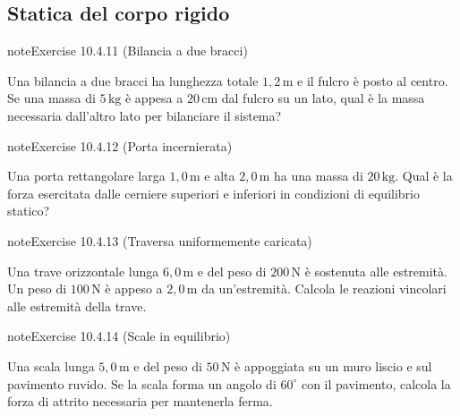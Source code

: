 \documentclass[letterpaper,10pt,italian]{jupyterBook}
\begin{document}
\subsection{Statica del corpo rigido}
\label{\detokenize{ch/mechanics/statics-problems:statica-del-corpo-rigido}} \label{exercise:ch/mechanics/statics-problems-exercise-10}

\begin{sphinxadmonition}{note}{Exercise 10.4.11 (Bilancia a due bracci)}



\sphinxAtStartPar
Una bilancia a due bracci ha lunghezza totale \(1,2 \, \text{m}\) e il fulcro è posto al centro. Se una massa di \(5 \, \text{kg}\) è appesa a \(20 \, \text{cm}\) dal fulcro su un lato, qual è la massa necessaria dall’altro lato per bilanciare il sistema?
\end{sphinxadmonition}
 \label{exercise:ch/mechanics/statics-problems-exercise-11}

\begin{sphinxadmonition}{note}{Exercise 10.4.12 (Porta incernierata)}



\sphinxAtStartPar
Una porta rettangolare larga \(1,0 \, \text{m}\) e alta \(2,0 \, \text{m}\) ha una massa di \(20 \, \text{kg}\). Qual è la forza esercitata dalle cerniere superiori e inferiori in condizioni di equilibrio statico?
\end{sphinxadmonition}
 \label{exercise:ch/mechanics/statics-problems-exercise-12}

\begin{sphinxadmonition}{note}{Exercise 10.4.13 (Traversa uniformemente caricata)}



\sphinxAtStartPar
Una trave orizzontale lunga \(6,0 \, \text{m}\) e del peso di \(200 \, \text{N}\) è sostenuta alle estremità. Un peso di \(100 \, \text{N}\) è appeso a \(2,0 \, \text{m}\) da un’estremità. Calcola le reazioni vincolari alle estremità della trave.
\end{sphinxadmonition}
 \label{exercise:ch/mechanics/statics-problems-exercise-13}

\begin{sphinxadmonition}{note}{Exercise 10.4.14 (Scale in equilibrio)}



\sphinxAtStartPar
Una scala lunga \(5,0 \, \text{m}\) e del peso di \(50 \, \text{N}\) è appoggiata su un muro liscio e sul pavimento ruvido. Se la scala forma un angolo di \(60^\circ\) con il pavimento, calcola la forza di attrito necessaria per mantenerla ferma.
\end{sphinxadmonition}
 \label{exercise:ch/mechanics/statics-problems-exercise-14}
\end{document}
